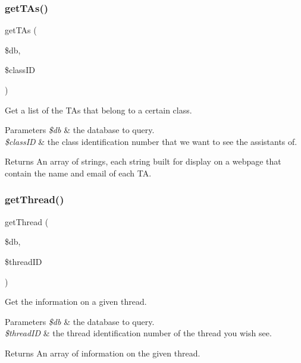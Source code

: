 \subsubsection{\texorpdfstring{get\+T\+As()}{getTAs()}}
{\footnotesize\ttfamily get\+T\+As (\begin{DoxyParamCaption}\item[{}]{\$db,  }\item[{}]{\$class\+ID }\end{DoxyParamCaption})}



Get a list of the T\+As that belong to a certain class. 


\begin{DoxyParams}{Parameters}
{\em \$db} & the database to query. \\
\hline
{\em \$class\+ID} & the class identification number that we want to see the assistants of. \\
\hline
\end{DoxyParams}
\begin{DoxyReturn}{Returns}
An array of strings, each string built for display on a webpage that contain the name and email of each TA. 
\end{DoxyReturn}
\mbox{\label{database_8php_a4703ef9116dadf19e01d244f00ae284e}} 
\subsubsection{\texorpdfstring{get\+Thread()}{getThread()}}
{\footnotesize\ttfamily get\+Thread (\begin{DoxyParamCaption}\item[{}]{\$db,  }\item[{}]{\$thread\+ID }\end{DoxyParamCaption})}



Get the information on a given thread. 


\begin{DoxyParams}{Parameters}
{\em \$db} & the database to query. \\
\hline
{\em \$thread\+ID} & the thread identification number of the thread you wish see. \\
\hline
\end{DoxyParams}
\begin{DoxyReturn}{Returns}
An array of information on the given thread. 
\end{DoxyReturn}
\mbox{\label{database_8php_a4f2da32a6120739b75f858cbf52eff0f}} 
